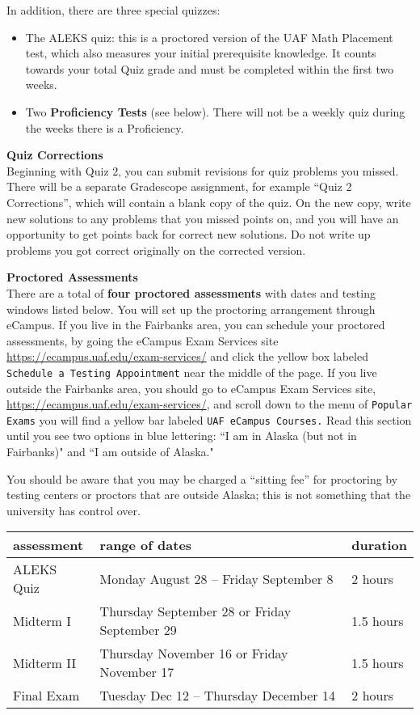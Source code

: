\documentclass[12pt]{article}
\renewcommand{\emph}[1]{\textsf{\textbf{#1}}}
\newcommand{\localhead}[1]{\par\smallskip\textbf{#1}\nobreak\\}%
\def\heading#1{\localhead{\large\emph{#1}}}
\begin{document}
In addition, there are three special quizzes:
\begin{itemize}
\item The ALEKS quiz: this is a proctored version of the UAF Math Placement test, which also measures your initial prerequisite knowledge. It counts towards your total Quiz grade and must be completed within the first two weeks.
\item Two \emph{Proficiency Tests} (see below). There will not be a weekly quiz during the weeks there is a Proficiency.
\end{itemize}

\heading{Quiz Corrections}
Beginning with Quiz 2, you can submit revisions for quiz problems you missed. There will be a separate Gradescope assignment, for example ``Quiz 2 Corrections'', which will contain a blank copy of the quiz. On the new copy, write new solutions to any problems that you missed points on, and you will have an opportunity to get points back for correct new solutions. Do not write up problems you got correct originally on the corrected version.

\heading{Proctored Assessments}
There are a total of \emph{four proctored assessments} with dates and testing windows listed below. You will set up the proctoring arrangement through eCampus.
If you live in the Fairbanks area, you can schedule your proctored assessments, by going the eCampus Exam Services site \url{https://ecampus.uaf.edu/exam-services/} and click the yellow box
labeled {\tt{Schedule a Testing Appointment}}
near the middle of the page.
If you live outside the Fairbanks area, you should go to eCampus Exam Services site, \url{https://ecampus.uaf.edu/exam-services/}, and scroll down to the menu of {\tt{Popular Exams}}
you will find a yellow bar labeled {\tt{UAF eCampus Courses.}} Read this section until you see two 
options in blue lettering: ``I am in Alaska (but not in Fairbanks)" and ``I am outside of Alaska."

You should be aware that you may be charged a ``sitting fee'' for proctoring by testing centers or proctors that are outside Alaska; this is not something that the university has control over. 

\begin{center}
\begin{tabular}{| l | l | l |}
\hline
assessment & range of dates & duration \\
\hline \hline
ALEKS Quiz & Monday August 28 -- Friday September 8 & 2 hours\\
\hline
Midterm I & Thursday September 28 or Friday September 29 & 1.5 hours \\
\hline
Midterm II & Thursday November 16 or Friday November 17 & 1.5 hours \\
\hline
Final Exam & Tuesday Dec 12 -- Thursday December 14& 2 hours \\
\hline
\end{tabular}
\end{center}
\end{document}
